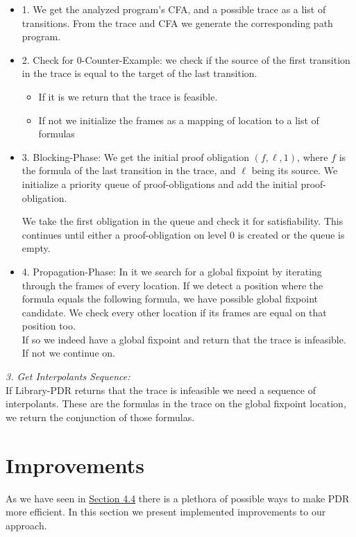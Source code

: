 \documentclass[11pt, a4paper, BCOR=10mm, ngerman]{scrbook}
\begin{document}
\begin{itemize}
	\item 1. We get the analyzed program's CFA, and a possible trace as a list of transitions. From the trace and CFA we generate the corresponding path program.
	\item 2. Check for 0-Counter-Example: we check if the source of the first transition in the trace is equal to the target of the last transition.
	 \begin{itemize}
		\item If it is we return that the trace is feasible.
		\item If not we initialize the frames as a mapping of location to a list of formulas
	 \end{itemize}
	\item 3. Blocking-Phase: We get the initial proof obligation $(f, \ell, 1)$, where $f$ is the formula of the last transition in the trace, and $\ell$ being its source. We initialize a priority queue of proof-obligations and add the initial proof-obligation. \par
	We take the first obligation in the queue and check it for satisfiability. This continues until either a proof-obligation on level 0 is created or the queue is empty.
	
	\item 4. Propagation-Phase: In it we search for a global fixpoint by iterating through the frames of every location. If we detect a position where the formula equals the following formula, we have possible global fixpoint candidate. We check every other location if its frames are equal on that position too. \\
	If so we indeed have a global fixpoint and return that the trace is infeasible. If not we continue on.
	
\end{itemize}
 
\textsl{3. Get Interpolants Sequence:} \\
If Library-PDR returns that the trace is infeasible we need a sequence of interpolants.
These are the formulas in the trace on the global fixpoint location, we return the conjunction of those formulas.
 

\section{Improvements}
As we have seen in \hyperref[improvements]{Section 4.4} there is a plethora of possible ways to make PDR more efficient. In this section we present implemented improvements to our approach.
\end{document}
